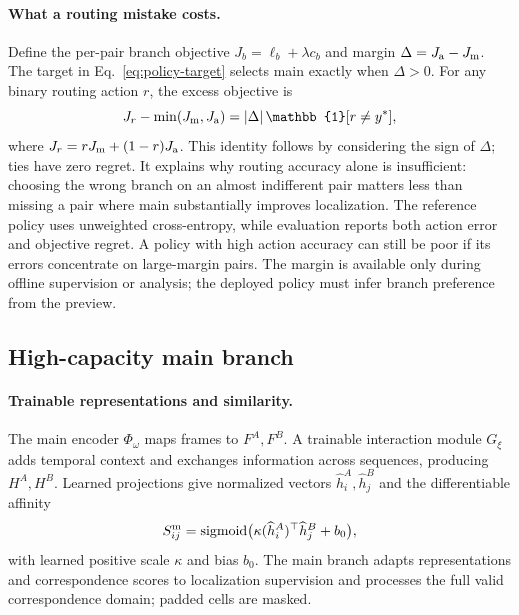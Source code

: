\paragraph{What a routing mistake costs.}
Define the per-pair branch objective $J_b=\ell_b+\lambda c_b$ and margin
$\Delta=J_{\rm a}-J_{\rm m}$. The target in Eq.~\ref{eq:policy-target} selects main exactly
when $\Delta>0$. For any binary routing action $r$, the excess objective is
\begin{equation}
J_{r}-\min(J_{\rm m},J_{\rm a})
=|\Delta|\,\mathbb{1}[r\ne y^*],
\label{eq:regret}
\end{equation}
where $J_r=rJ_{\rm m}+(1-r)J_{\rm a}$. This identity follows by considering the sign of
$\Delta$; ties have zero regret. It explains why routing accuracy alone is insufficient:
choosing the wrong branch on an almost indifferent pair matters less than missing a pair
where main substantially improves localization. The reference policy uses unweighted
cross-entropy, while evaluation reports both action error and objective regret. A policy
with high action accuracy can still be poor if its errors concentrate on large-margin
pairs. The margin is available only during offline supervision or analysis; the deployed
policy must infer branch preference from the preview.

\subsection{High-capacity main branch}
\label{sec:main-branch}
\paragraph{Trainable representations and similarity.}
The main encoder $\Phi_\omega$ maps frames to $F^A,F^B$. A trainable interaction module
$G_\xi$ adds temporal context and exchanges information across sequences, producing
$H^A,H^B$. Learned projections give normalized vectors $\widehat h_i^A,\widehat h_j^B$
and the differentiable affinity
\begin{equation}
S^{\rm m}_{ij}=\operatorname{sigmoid}
\bigl(\kappa(\widehat h_i^A)^\top\widehat h_j^B+b_0\bigr),
\label{eq:main-sim}
\end{equation}
with learned positive scale $\kappa$ and bias $b_0$. The main branch adapts representations
and correspondence scores to localization supervision and processes the full valid
correspondence domain; padded cells are masked.

